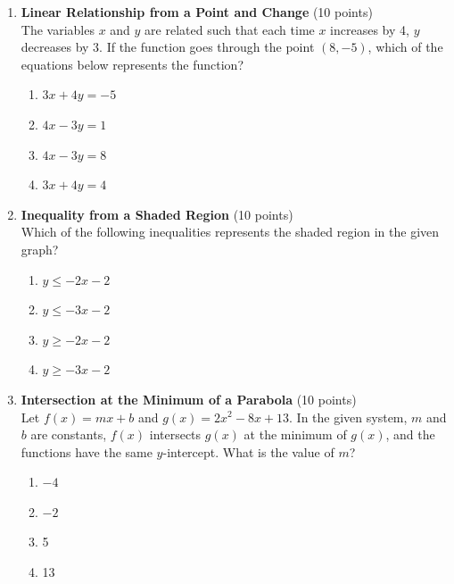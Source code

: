 \begin{enumerate}
  \newpage

  \item \textbf{Linear Relationship from a Point and Change} (10 points)\\
  The variables $x$ and $y$ are related such that each time $x$ increases by 4, $y$ decreases by 3. If the function goes through the point $(8, -5)$, which of the equations below represents the function?
  \begin{enumerate}[label=(\Alph*)]
    \item $3x + 4y = -5$
    \item $4x - 3y = 1$
    \item $4x - 3y = 8$
    \item $3x + 4y = 4$
  \end{enumerate}
  \begin{subanswer}
  \end{subanswer}

  \item \textbf{Inequality from a Shaded Region} (10 points)\\
  Which of the following inequalities represents the shaded region in the given graph?
  \begin{enumerate}[label=(\Alph*)]
    \item $y \leq -2x - 2$
    \item $y \leq -3x - 2$
    \item $y \geq -2x - 2$
    \item $y \geq -3x - 2$
  \end{enumerate}
  \begin{subanswer}
  \end{subanswer}


  \newpage

  \item \textbf{Intersection at the Minimum of a Parabola} (10 points)\\
  Let $f(x) = mx + b$ and $g(x) = 2x^2 - 8x + 13$. In the given system, $m$ and $b$ are constants, $f(x)$ intersects $g(x)$ at the minimum of $g(x)$, and the functions have the same $y$-intercept. What is the value of $m$?
  \begin{enumerate}[label=(\Alph*)]
    \item $-4$
    \item $-2$
    \item 5
    \item 13
  \end{enumerate}
  \begin{subanswer}
  \end{subanswer}


\end{enumerate}
